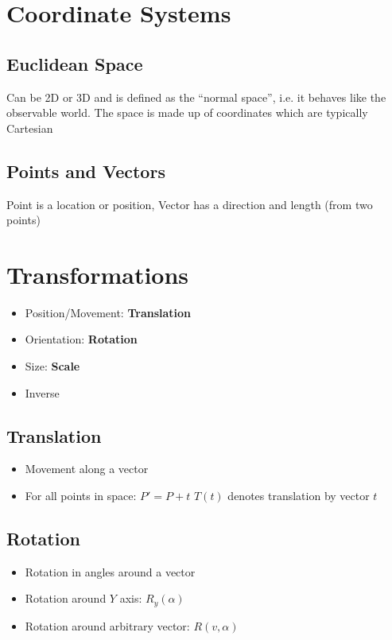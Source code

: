 \section{Coordinate Systems}
\subsection{Euclidean Space}
Can be 2D or 3D and is defined as the ``normal space'', i.e. it behaves like the observable world. The space is made up of coordinates which are typically Cartesian

\subsection{Points and Vectors}
Point is a location or position, Vector has a direction and length (from two points)

\section{Transformations}
\begin{itemize}
	\item Position/Movement: \textbf{Translation}
	\item Orientation: \textbf{Rotation}
	\item Size: \textbf{Scale}
	\item Inverse	
\end{itemize}

\subsection{Translation}
\begin{itemize}
	\item Movement along a vector
	\item For all points in space:
	\subitem $P' = P + t$
	\subitem $T(t)$ denotes translation by vector $t$	
\end{itemize}

\subsection{Rotation}
\begin{itemize}
	\item Rotation in angles around a vector
	\item Rotation around $Y$ axis: $R_y(\alpha)$
	\item Rotation around arbitrary vector: $R(v,\alpha)$	
\end{itemize}

